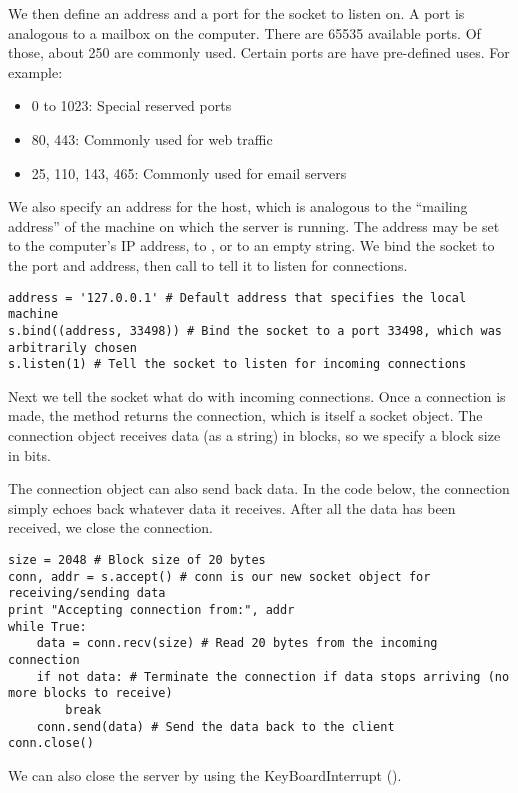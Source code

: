 We then define an address and a port for the socket to listen on.
A port is analogous to a mailbox on the computer.
There are 65535 available ports.
Of those, about 250 are commonly used.
Certain ports are have pre-defined uses. For example:
\begin{itemize}
    \item 0 to 1023: Special reserved ports
    \item  80, 443: Commonly used for web traffic
    \item 25, 110, 143, 465: Commonly used for email servers
\end{itemize}
We also specify an address for the host, which is analogous to the ``mailing address'' of the machine on which the server is running.
The address may be set to the computer's IP address, to , or to an empty string.
We bind the socket to the port and address, then call  to tell it to listen for connections.

\begin{lstlisting}
address = '127.0.0.1' # Default address that specifies the local machine
s.bind((address, 33498)) # Bind the socket to a port 33498, which was arbitrarily chosen
s.listen(1) # Tell the socket to listen for incoming connections
\end{lstlisting}

Next we tell the socket what do with incoming connections.
Once a connection is made, the  method returns the connection, which is itself a socket object.
The connection object receives data (as a string) in blocks, so we specify a block size in bits.

The connection object can also send back data.
In the code below, the connection simply echoes back whatever data it receives.
After all the data has been received, we close the connection.

\begin{lstlisting}
size = 2048 # Block size of 20 bytes
conn, addr = s.accept() # conn is our new socket object for receiving/sending data
print "Accepting connection from:", addr
while True:
	data = conn.recv(size) # Read 20 bytes from the incoming connection
	if not data: # Terminate the connection if data stops arriving (no more blocks to receive)
		break
	conn.send(data) # Send the data back to the client
conn.close()
\end{lstlisting}

We can also close the server by using the KeyBoardInterrupt ().

